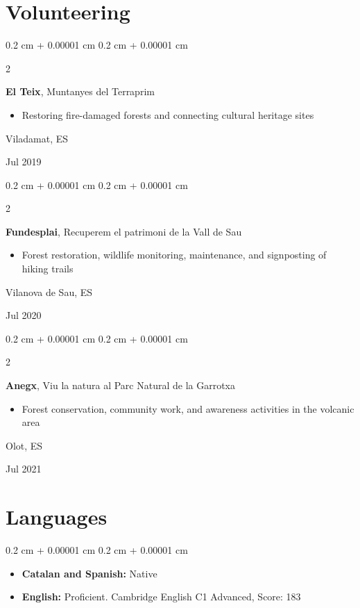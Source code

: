 \documentclass[10pt, letterpaper]{article}
\newenvironment{highlightsforbulletentries}{
    \begin{itemize}[
        topsep=0.10 cm,
        parsep=0.10 cm,
        partopsep=0pt,
        itemsep=0pt,
        leftmargin=10pt
    ]
}{
    \end{itemize}
} %
\newenvironment{onecolentry}{
    \begin{adjustwidth}{
        0.2 cm + 0.00001 cm
    }{
        0.2 cm + 0.00001 cm
    }
}{
    \end{adjustwidth}
} %
\newenvironment{twocolentry}[2][]{
    \onecolentry
    \def\secondColumn{#2}
    \setcolumnwidth{\fill, 4.5 cm}
    \begin{paracol}{2}
}{
    \switchcolumn \raggedleft \secondColumn
    \end{paracol}
    \endonecolentry
} %
\begin{document}
    \section{Volunteering}
        \begin{twocolentry}{
            Viladamat, ES
            
            Jul 2019
        }
            \textbf{El Teix}, Muntanyes del Terraprim
            \begin{highlightsforbulletentries}
                \item Restoring fire-damaged forests and connecting cultural heritage sites
            \end{highlightsforbulletentries}
        \end{twocolentry}

        \vspace{0.2 cm}

        \begin{twocolentry}{
            Vilanova de Sau, ES
            
            Jul 2020
        }
            \textbf{Fundesplai}, Recuperem el patrimoni de la Vall de Sau
            \begin{highlightsforbulletentries}
                \item Forest restoration, wildlife monitoring, maintenance, and signposting of hiking trails
            \end{highlightsforbulletentries}
        \end{twocolentry}

        \vspace{0.2 cm}

        \begin{twocolentry}{
            Olot, ES
            
            Jul 2021
        }
            \textbf{Anegx}, Viu la natura al Parc Natural de la Garrotxa
            \begin{highlightsforbulletentries}
                \item Forest conservation, community work, and awareness activities in the volcanic area
            \end{highlightsforbulletentries}
        
        \end{twocolentry}
            

    \section{Languages}
        \begin{onecolentry}
            \begin{highlightsforbulletentries}
                \item \textbf{Catalan and Spanish:} Native
                \item \textbf{English:} Proficient. Cambridge English C1 Advanced, Score: 183
            \end{highlightsforbulletentries}
        \end{onecolentry}
\end{document}
